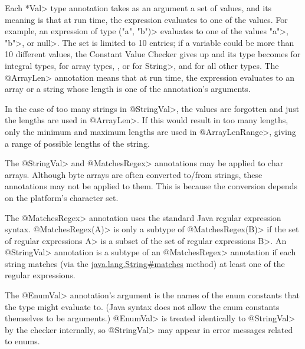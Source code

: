 Each \<*Val> type annotation takes as an argument a set of values, and its
meaning is that at run time, the expression evaluates to one of the values.  For
example, an expression of type
\<("a", "b")> evaluates to
one of the values \<"a">, \<"b">, or \<null>.
The set is limited to 10 entries; if a variable
could be more than 10 different values, the Constant Value
Checker gives up and its type becomes
 for integral types,
 for array types,
,
 or  for \<String>, and
 for all other types.
The \<@ArrayLen> annotation means that at run time, the expression
evaluates to an array or a string whose length is one of the annotation's arguments.

In the case of too many strings in \<@StringVal>, the values are forgotten
and just the lengths are used in \<@ArrayLen>.
If this would result in too many lengths,
only the minimum and maximum lengths are used in \<@ArrayLenRange>,
giving a range of possible lengths of the string.

The \<@StringVal> and \<@MatchesRegex> annotations may be applied to char arrays.  Although byte
arrays are often converted to/from strings, these annotations may
not be applied to them.  This is because the conversion depends on the
platform's character set.

The \<@MatchesRegex> annotation uses the standard Java regular expression syntax.
\<@MatchesRegex(A)> is only a subtype of \<@MatchesRegex(B)> if the set of regular
expressions \<A> is a subset of the set of regular expressions \<B>. An \<@StringVal> annotation is
a subtype of an \<@MatchesRegex> annotation if each string matches
(via the \href{https://docs.oracle.com/javase/8/docs/api/java/lang/String.html\#matches-java.lang.String-}{java.lang.String\#matches} method)
at least one of the regular expressions.

The \<@EnumVal> annotation's argument is the names of the enum constants
that the type might evaluate to.  (Java syntax does not allow the enum
constants themselves to be arguments.)  \<@EnumVal>
is treated identically to \<@StringVal> by the checker internally, so
\<@StringVal> may appear in error messages related to enums.


